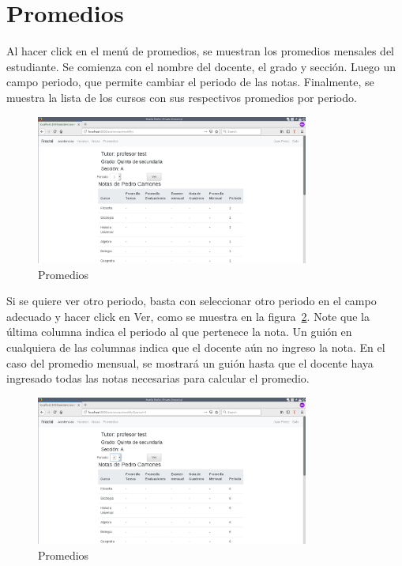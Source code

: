 \documentclass[12pt]{article}
\begin{document}
\section{Promedios}
Al hacer click en el men\'u de promedios, se muestran los promedios mensales del estudiante. 
Se comienza con el nombre del docente, el grado y secci\'on. Luego un campo periodo, que permite
cambiar el periodo de las notas.
Finalmente, se muestra la lista de los cursos con sus respectivos promedios por periodo.
\begin{figure}[ht]
  \centering
  \includegraphics[width=0.8\textwidth]{images/apoderado5.png}
  \caption{Promedios}
  \label{fig:promedios}
\end{figure}
Si se quiere ver otro periodo, basta con seleccionar otro periodo en el campo adecuado y hacer click en 
Ver, como se muestra en la figura~\ref{fig:promedios_select}. Note que la \'ultima columna indica el
periodo al que pertenece la nota.
Un gui\'on en cualquiera de las columnas indica que el docente a\'un 
no ingreso la nota.
En el caso del promedio mensual, se mostrar\'a un gui\'on hasta que el docente haya ingresado todas las
notas necesarias para calcular el promedio.
\begin{figure}[ht]
  \centering
  \includegraphics[width=0.8\textwidth]{images/apoderado6.png}
  \caption{Promedios}
  \label{fig:promedios_select}
\end{figure}
\end{document}
